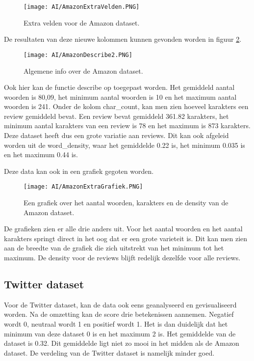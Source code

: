 \begin{figure}[!htbp]
    \texttt{[image: AI/AmazonExtraVelden.PNG]}
    \caption{\label{amazonaantalwoorden}Extra velden voor de Amazon dataset.}
\end{figure}
\FloatBarrier

De resultaten van deze nieuwe kolommen kunnen gevonden worden in figuur \ref{amazondescribe2}.

\begin{figure}[!htbp]
    \texttt{[image: AI/AmazonDescribe2.PNG]}
    \caption{\label{amazondescribe2}Algemene info over de Amazon dataset.}
\end{figure}
\FloatBarrier

Ook hier kan de functie describe op toegepast worden. Het gemiddeld aantal woorden is 80,09, het minimum aantal woorden is 10 en het maximum aantal woorden is 241. Onder de kolom char\_count, kan men zien hoeveel karakters een review gemiddeld bevat. Een review bevat gemiddeld 361.82 karakters, het minimum aantal karakters van een review is 78 en het maximum is 873 karakters. Deze dataset heeft dus een grote variatie aan reviews. Dit kan ook afgeleid worden uit de word\_density, waar het gemiddelde 0.22 is, het minimum 0.035 is en het maximum 0.44 is.

Deze data kan ook in een grafiek gegoten worden.

\begin{figure}[!htbp]
    \texttt{[image: AI/AmazonExtraGrafiek.PNG]}
    \caption{\label{amazongrafiek}Een grafiek over het aantal woorden, karakters en de density van de Amazon dataset.}
\end{figure}
\FloatBarrier


De grafieken zien er alle drie anders uit. Voor het aantal woorden en het aantal karakters springt direct in het oog dat er een grote varieteit is. Dit kan men zien aan de breedte van de grafiek die zich uitstrekt van het minimum tot het maximum. De \gls{density} voor de reviews blijft redelijk dezelfde voor alle reviews. 


\subsection{Twitter dataset}
Voor de Twitter dataset, kan de data ook eens geanalyseerd en gevisualiseerd worden. Na de omzetting kan de score drie betekenissen aannemen. Negatief wordt 0, neutraal wordt 1 en positief wordt 1. Het is dan duidelijk dat het minimum van deze dataset 0 is en het maximum 2 is. Het gemiddelde van de dataset is 0.32. Dit gemiddelde ligt niet zo mooi in het midden als de Amazon dataset. De verdeling van de Twitter dataset is namelijk minder goed. 

